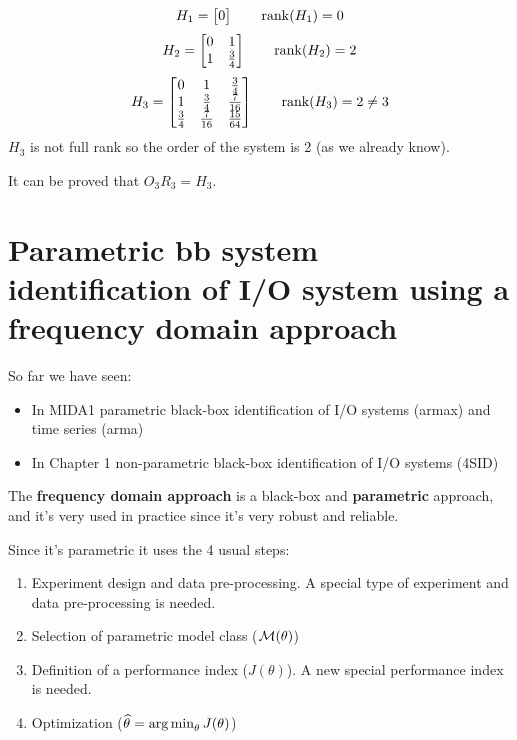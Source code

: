 \begin{exa}
    \[
        H_1 = \begin{bmatrix}
            0
        \end{bmatrix}
        \qquad \operatorname*{rank} (H_1) = 0
    \]
    \[
        H_2 = \begin{bmatrix}
            0 & 1 \\
            1 & \frac{3}{4}
        \end{bmatrix}
        \qquad \operatorname*{rank} (H_2) = 2
    \]
    \[
        H_3 = \begin{bmatrix}
            0 & 1 & \frac{3}{4} \\
            1 & \frac{3}{4} & \frac{7}{16} \\
            \frac{3}{4} & \frac{7}{16} & \frac{15}{64}
        \end{bmatrix}
        \qquad \operatorname*{rank} (H_3) = 2 \neq 3
    \]
    $H_3$ is not full rank so the order of the system is 2 (as we already know). 
    
    It can be proved that $O_3R_3 = H_3$.
\end{exa}

\chapter{Parametric \acrlong{bb} system identification of I/O system using a frequency domain approach}

So far we have seen:
\begin{itemize}
    \item In MIDA1 parametric black-box identification of I/O systems (\gls{armax}) and time series (\gls{arma})
    \item In Chapter 1 non-parametric black-box identification of I/O systems (4SID)
\end{itemize}

The \textbf{frequency domain approach} is a black-box and \textbf{parametric} approach, and it's very used in practice since it's very robust and reliable.

Since it's parametric it uses the 4 usual steps:
\begin{enumerate}
    \item Experiment design and data pre-processing. A special type of experiment and data pre-processing is needed.
    \item Selection of parametric model class ($\mathcal{M}(\theta)$)
    \item Definition of a performance index ($J(\theta)$). A new special performance index is needed.
    \item Optimization ($\widehat{\theta} = \operatorname*{arg\,min}_\theta J(\theta)$)
\end{enumerate}

